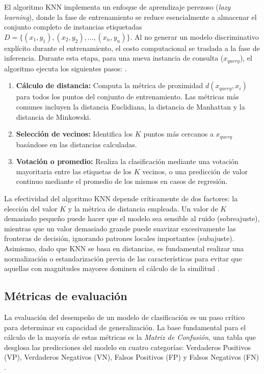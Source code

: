 \documentclass[12pt]{article}
\begin{document}
El algoritmo KNN implementa un enfoque de aprendizaje perezoso (\textit{lazy learning}), donde la fase de entrenamiento se reduce esencialmente a almacenar el conjunto completo de instancias etiquetadas $D = \{(x_1, y_1), (x_2, y_2), \dots, (x_n, y_n)\}$. Al no generar un modelo discriminativo explícito durante el entrenamiento, el costo computacional se traslada a la fase de inferencia. Durante esta etapa, para una nueva instancia de consulta ($x_{query}$), el algoritmo ejecuta los siguientes pasos:
\cite{hastie2009elements}.



\begin{enumerate}
    \item \textbf{Cálculo de distancia:} Computa la métrica de proximidad $d(x_{query}, x_i)$ para todos los puntos del conjunto de entrenamiento. Las métricas más comunes incluyen la distancia Euclidiana, la distancia de Manhattan y la distancia de Minkowski.
    \item \textbf{Selección de vecinos:} Identifica los $K$ puntos más cercanos a $x_{query}$ basándose en las distancias calculadas.
    \item \textbf{Votación o promedio:} Realiza la clasificación mediante una votación mayoritaria entre las etiquetas de los $K$ vecinos, o una predicción de valor continuo mediante el promedio de los mismos en casos de regresión.
\end{enumerate}

La efectividad del algoritmo KNN depende críticamente de dos factores: la elección del valor $K$ y la métrica de distancia empleada. Un valor de $K$ demasiado pequeño puede hacer que el modelo sea sensible al ruido (sobreajuste), mientras que un valor demasiado grande puede suavizar excesivamente las fronteras de decisión, ignorando patrones locales importantes (subajuste). Asimismo, dado que KNN se basa en distancias, es fundamental realizar una normalización o estandarización previa de las características para evitar que aquellas con magnitudes mayores dominen el cálculo de la similitud \cite{raschka2015python}.

\cite{De0a100enIA}

\subsection{Métricas de evaluación}

La evaluación del desempeño de un modelo de clasificación es un paso crítico para determinar su capacidad de generalización. La base fundamental para el cálculo de la mayoría de estas métricas es la \textit{Matriz de Confusión}, una tabla que desglosa las predicciones del modelo en cuatro categorías: Verdaderos Positivos (VP), Verdaderos Negativos (VN), Falsos Positivos (FP) y Falsos Negativos (FN) \cite{fawcett2006introduction}.
\end{document}
